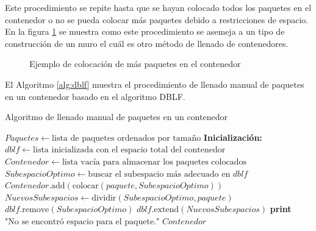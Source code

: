 \documentclass[openany]{article}
\begin{document}
Este procedimiento se repite hasta que se hayan colocado todos los paquetes en el contenedor o no se pueda colocar más paquetes debido a restricciones de espacio. En la figura \ref{fig:contruccion_muro} se muestra como este procedimiento se asemeja a un tipo de construcción de un muro el cuál es otro método de llenado de contenedores.

\begin{figure}[H]
    \centering
    
    \caption{Ejemplo de colocación de más paquetes en el contenedor}
    \label{fig:contruccion_muro}
\end{figure}

El Algoritmo \ref{alg:dblf} muestra el procedimiento de llenado manual de paquetes en un contenedor basado en el algoritmo DBLF.

\begin{algorithm}[H]
    \caption{Algoritmo de llenado manual de paquetes en un contenedor}
    \label{alg:dblf}
    \begin{algorithmic}[1]
        \State $Paquetes \gets \text{lista de paquetes ordenados por tamaño}$
        \State \textbf{Inicialización:} $dblf \gets \text{lista inicializada con el espacio total del contenedor}$
        \State $Contenedor \gets \text{lista vacía para almacenar los paquetes colocados}$
        \State $SubespacioOptimo \gets \text{buscar el subespacio más adecuado en } dblf$
        \State $Contenedor.\text{add}( \text{colocar}(paquete, SubespacioOptimo) )$
        \State $NuevosSubespacios \gets \text{dividir}(SubespacioOptimo, paquete)$
        \State $dblf.\text{remove}(SubespacioOptimo)$
        \State $dblf.\text{extend}(NuevosSubespacios)$
        \Else
        \State \textbf{print} $\text{"No se encontró espacio para el paquete."}$
        \EndIf
        \EndFor
        \State \Return $Contenedor$
    \end{algorithmic}
\end{algorithm}
\end{document}
